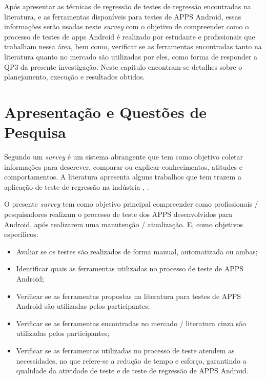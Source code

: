 \acresetall 

Após apresentar as técnicas de regressão de testes de regressão encontradas na literatura, e as ferramentas disponíveis para testes de \ac{APPS} Android, essas informações serão usadas neste \textit{survey} com o objetivo de compreender como o processo de testes de apps Android é realizado por estudante e profissionais que trabalham nessa área, bem como, verificar se as ferramentas encontradas tanto na literatura quanto no mercado são utilizadas por eles, como forma de responder a QP3 da presente investigação. Neste capítulo encontram-se detalhes sobre o planejamento, execução e resultados obtidos.

\section{Apresentação e Questões de Pesquisa}

Segundo \cite{PSK2001} um \textit{survey} é um sistema abrangente que tem como objetivo coletar informações para descrever, comparar ou explicar conhecimentos, atitudes e comportamentos. A literatura apresenta alguns trabalhos que tem trazem a aplicação de teste de regressão na indústria \cite{Ali2019}, \cite{630875}.


O presente \textit{survey} tem como objetivo principal compreender como profissionais / pesquisadores realizam o processo de teste dos \ac{APPS} desenvolvidos para Android, após realizarem uma manutenção / atualização. E, como objetivos específicos:

\begin{itemize}
    \item Avaliar se os testes são realizados de forma manual, automatizada ou ambas;
    \item Identificar quais as ferramentas utilizadas no processo de teste de \ac{APPS} Android;
    \item Verificar se as ferramentas propostas na literatura para testes de \ac{APPS} Android são utilizadas pelos participantes;
    \item Verificar se as ferramentas encontradas no mercado / literatura cinza são utilizadas pelos participantes;
    \item Verificar se as ferramentas utilizadas no processo de teste atendem as necessidades, no que refere-se a redução de tempo e esforço, garantindo a qualidade da atividade de teste e de teste de regressão de \ac{APPS} Android.
\end{itemize}

